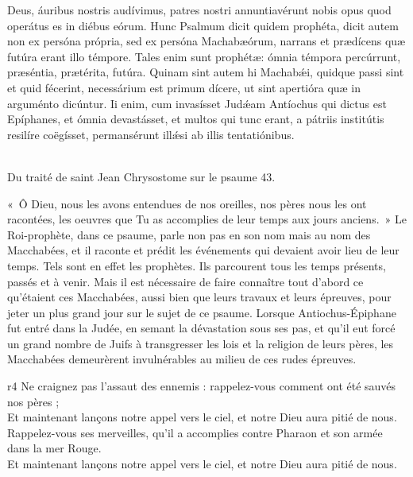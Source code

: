 \documentclass[twoside]{article}
\begin{document}
\begin{paracol}[1]{2}
{		Deus, áuribus nostris audívimus, patres nostri annuntiavérunt nobis opus quod operátus es in diébus eórum. Hunc Psalmum dicit quidem prophéta, dicit autem non ex persóna própria, sed ex persóna Machabæórum, narrans et prædícens quæ futúra erant illo témpore. Tales enim sunt prophétæ: ómnia témpora percúrrunt, præséntia, prætérita, futúra. Quinam sint autem hi Machabǽi, quidque passi sint et quid fécerint, necessárium est primum dícere, ut sint apertióra quæ in arguménto dicúntur. Ii enim, cum invasísset Judǽam Antíochus qui dictus est Epíphanes, et ómnia devastásset, et multos qui tunc erant, a pátriis institútis resilíre coëgísset, permansérunt illǽsi ab illis tentatiónibus.
	}
	{
		~\\Du traité de saint Jean Chrysostome sur le psaume 43.
	
		«~Ô Dieu, nous les avons entendues de nos oreilles, nos pères nous les ont racontées, les oeuvres que Tu as accomplies de leur temps aux jours anciens.~» Le Roi-prophète, dans ce psaume, parle non pas en son nom mais au nom des Macchabées, et il raconte et prédit les événements qui devaient avoir lieu de leur temps. Tels sont en effet les prophètes. Ils parcourent tous les temps présents, passés et à venir. Mais il est nécessaire de faire connaître tout d'abord ce qu'étaient ces Macchabées, aussi bien que leurs travaux et leurs épreuves, pour jeter un plus grand jour sur le sujet de ce psaume. Lorsque Antiochus-Épiphane fut entré dans la Judée, en semant la dévastation sous ses pas, et qu'il eut forcé un grand nombre de Juifs à transgresser les lois et la religion de leurs pères, les Macchabées demeurèrent invulnérables au milieu de ces rudes épreuves.}
	{r4}
	{\vfill
	\rr Ne craignez pas l’assaut des ennemis : rappelez-vous comment ont été sauvés nos pères ;\\
	\GreSpecial{*} Et maintenant lançons notre appel vers le ciel, et notre Dieu aura pitié de nous.\\
	\vv Rappelez-vous ses merveilles, qu’il a accomplies contre Pharaon et son armée dans la mer Rouge.\\
	\GreSpecial{*} Et maintenant lançons notre appel vers le ciel, et notre Dieu aura pitié de nous.
	\vfill}


\end{paracol}
\end{document}
